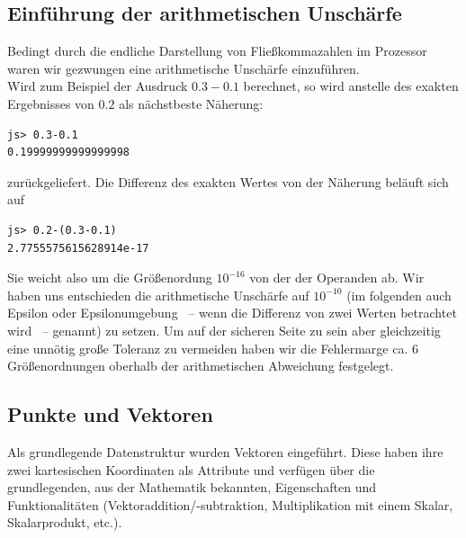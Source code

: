 \documentclass[a4paper,twocolumn]{scrartcl}
\begin{document}
\subsection{Einführung der arithmetischen Unschärfe}
Bedingt durch die endliche Darstellung von Flie\ss kommazahlen im Prozessor waren wir gezwungen eine arithmetische
Unsch\"arfe einzuf\"uhren. \\
Wird zum Beispiel der Ausdruck $0.3-0.1$ berechnet, so wird anstelle des exakten Ergebnisses von $0.2$ 
als n\"achstbeste  Näherung:
\begin{lstlisting}
js> 0.3-0.1
0.19999999999999998
\end{lstlisting}
zur\"uckgeliefert. Die Differenz des exakten Wertes von der N\"aherung bel\"auft sich auf
\begin{lstlisting}
js> 0.2-(0.3-0.1)
2.7755575615628914e-17
\end{lstlisting}
Sie weicht also um die Gr\"o\ss enordung $10^{-16}$ von der der Operanden ab.
Wir haben uns entschieden die arithmetische Unsch\"arfe auf $10^{-10}$ (im folgenden auch Epsilon oder Epsilonumgebung ~-- wenn die Differenz von zwei Werten betrachtet wird ~-- genannt) zu setzen. Um auf der sicheren Seite zu sein aber gleichzeitig eine unnötig große Toleranz zu vermeiden haben wir die Fehlermarge ca. 6 Größenordnungen oberhalb der arithmetischen Abweichung festgelegt.
\subsection{Punkte und Vektoren}
Als grundlegende Datenstruktur wurden Vektoren eingef\"uhrt. Diese haben ihre zwei kartesischen Koordinaten als
Attribute und verf\"ugen \"uber die grundlegenden, aus der Mathematik bekannten, Eigenschaften und Funktionalit\"aten
(Vektoraddition/-subtraktion,
Multiplikation mit einem Skalar, Skalarprodukt, etc.).
\end{document}
